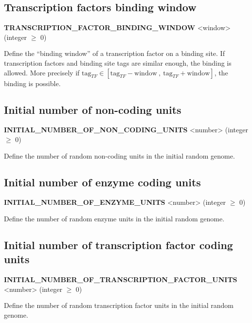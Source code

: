 
\subsection{Transcription factors binding window}
\begin{center}
{\bf TRANSCRIPTION\_FACTOR\_BINDING\_WINDOW} <window> (integer $\ge$ 0)
\end{center}
Define the ``binding window'' of a transcription factor on a binding site. If transcription factors and binding site tags are similar enough, the binding is allowed. More precisely if $\mbox{tag}_{TF} \in [\mbox{tag}_{TF}-\mbox{window}\ ,\ \mbox{tag}_{TF}+\mbox{window}]$, the binding is possible.


\subsection{Initial number of non-coding units}
\begin{center}
{\bf INITIAL\_NUMBER\_OF\_NON\_CODING\_UNITS} <number> (integer $\ge$ 0)
\end{center}
Define the number of random non-coding units in the initial random genome.


\subsection{Initial number of enzyme coding units}
\begin{center}
{\bf INITIAL\_NUMBER\_OF\_ENZYME\_UNITS} <number> (integer $\ge$ 0)
\end{center}
Define the number of random enzyme units in the initial random genome.


\subsection{Initial number of transcription factor coding units}
\begin{center}
{\bf INITIAL\_NUMBER\_OF\_TRANSCRIPTION\_FACTOR\_UNITS} <number> (integer $\ge$ 0)
\end{center}
Define the number of random transcription factor units in the initial random genome.

